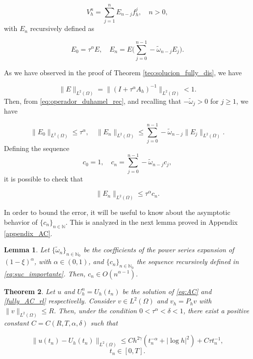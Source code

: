 \documentclass{amsart}
\newcommand{\w}{\omega}
\newcommand{\W}{\Omega}
\newcommand{\wtilde}{\tilde{\w}}
\def\N{{\mathbb {N}}}
\newtheorem{theorem}{Theorem}[section]
\newtheorem{lemma}[theorem]{Lemma}
\theoremstyle{remark}
\theoremstyle{definition}
\numberwithin{equation}{section}
\begin{document}
 \begin{equation}
\label{eq:duhamel_fuente3}
          V_h^n    = \sum^{n}_{j = 1} E_{n - j}  f^j_h, \quad n>0, 
\end{equation}
with $E_n$ recursively defined as


\begin{equation}
\label{eq:operador_duhamel_rec}
E_{0} =  \tau^{\alpha}E, \quad E_n = E \Big( \sum^{n-1}_{j=0} -\wtilde_{n-j} E_{j} \Big).
\end{equation}


As we have observed in the proof of Theorem \ref{teo:solucion_fully_dis}, we have

 $$\|E\|_{L^2(\W)} = \|(I + \tau^{\alpha} A_h)^{-1}\|_{L^2(\W)} < 1.$$Then, from \eqref{eq:operador_duhamel_rec}, and recalling that $-\wtilde_j>0$ for $j \geq 1$,  we have

\begin{equation}
\label{eq:estimacion_duhamel}
\|E_{0}\|_{L^2(\W)} \leq  \tau^{\alpha}, \quad \|E_n\|_{L^2(\W)} \leq  \sum^{n-1}_{j=0} -\wtilde_{n-j} \|E_{j}\|_{L^2(\W)}.
\end{equation}
Defining the sequence
\begin{equation}
\label{eq:suc_importante}
c_0 = 1, \quad c_n = \sum^{n-1}_{j=0} -\wtilde_{n-j} c_{j}, 
\end{equation}
it is possible to check that 

\begin{equation}
\label{eq:est_operador_error}
\|E_n\|_{L^2(\W)} \leq \tau^{\alpha} c_n.
\end{equation}  

In order to bound the error, it will be useful to know about the asymptotic behavior of $\{c_n\}_{n \in \N}$. This is analyzed in the next lemma proved in  Appendix \ref{appendix_AC}.


\begin{lemma}
\label{lem:lemma_seq}
Let $\{\wtilde_n\}_{n \in \mathbb{N}_0}$ be the coefficients of the power series expansion of $(1-\xi)^{\alpha}$, with $\alpha \in (0,1)$, and $\{c_n\}_{n \in \mathbb{N}_0}$ the sequence recursively defined in \eqref{eq:suc_importante}. Then, $c_n \in O(n^{\alpha - 1})$. 

\end{lemma}
\begin{theorem}
\label{teo:error_fully_alfa}
Let $u$ and $U^n_h = U_h(t_n)$ be the solution of \eqref{eq:AC} and \eqref{fully_AC_rl} respectivelly. Consider $v \in L^2(\Omega)$ and $v_h = P_hv$ with $\|v\|_{L^2(\Omega)}\leq R$. Then, under the condition $0<\tau^{\alpha}<\delta<1$, there exist a positive constant $C=C( R , T , \alpha , \delta)$ such that   

\begin{equation}
\|u(t_n) - U_h(t_n)\|_{L^2(\Omega)} \leq Ch^{2\gamma}(t_n^{-\alpha} + |\log{h}|^2 ) + C\tau t_n^{-1}, 
\label{eq:errorACF_alpha}
\end{equation}
$$ t_n\in [0,T].$$
\end{theorem}
\end{document}
